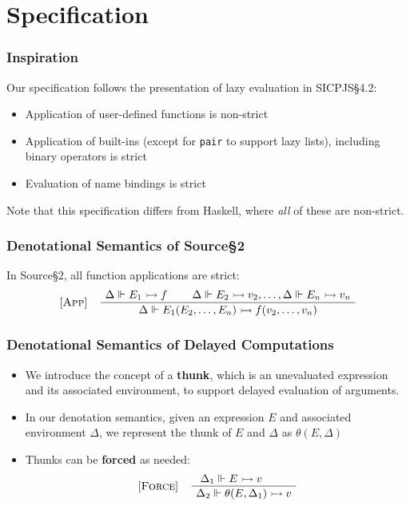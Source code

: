 \documentclass[12pt]{beamer}
\makeatletter
\newenvironment{boxedprooftree}[1][c]
 {\begin{tabular}[#1]{@{}c@{}}}
 {\DisplayProof\end{tabular}}
\makeatother
\begin{document}
\section{Specification}

\begin{frame}
\frametitle{Inspiration}
Our specification follows the presentation of lazy evaluation in SICPJS\S4.2:\pause[1]
\begin{itemize}
\item<2->Application of user-defined functions is non-strict
\item<3->Application of built-ins (except for \texttt{pair} to support lazy lists), including binary operators is strict
\item<4->Evaluation of name bindings is strict
\end{itemize}
\pause[5]Note that this specification differs from Haskell, where \textit{all} of these are non-strict.
\end{frame}

\begin{frame}
\frametitle{Denotational Semantics of Source\S2}
In Source\S2, all function applications are strict:
\[
\begin{tabular}{@{} l c @{}}
[\textsc{App}] &
  \begin{boxedprooftree}
  \AxiomC{$\Delta\Vdash E_1\rightarrowtail f$}
  \AxiomC{$\Delta\Vdash E_2\rightarrowtail v_2,\ldots,\Delta\Vdash E_n\rightarrowtail v_n$}
  \BinaryInfC{$\Delta\Vdash E_1(E_2,\ldots,E_n)\rightarrowtail f(v_2,\ldots,v_n)$}
  \end{boxedprooftree}
\end{tabular}
\]
\end{frame}

\begin{frame}
\frametitle{Denotational Semantics of Delayed Computations}
\begin{itemize}
\item<1-> We introduce the concept of a \textbf{thunk}, which is an unevaluated expression and its associated environment, to support delayed evaluation of arguments.
\item<2-> In our denotation semantics, given an expression $E$ and associated environment $\Delta$, we represent the thunk of $E$ and $\Delta$ as $\theta(E, \Delta)$
\item<3-> Thunks can be \textbf{forced} as needed:
\[
\begin{tabular}{@{} l c @{}}
[\textsc{Force}] &
  \begin{boxedprooftree}
  \AxiomC{$\Delta_1\Vdash E \rightarrowtail v$}
  \AxiomC{}
  \BinaryInfC{$\Delta_2\Vdash\theta(E, \Delta_1)\rightarrowtail v$}
  \end{boxedprooftree}
\end{tabular}
\]
\end{itemize}

\end{frame}
\end{document}
